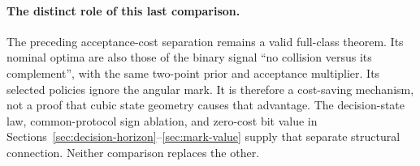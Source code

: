 \documentclass[11pt,a4paper]{article}
\theoremstyle{definition}
\theoremstyle{remark}\newtheorem{remark}[theorem]{Remark}
\begin{document}
\paragraph{The distinct role of this last comparison.}
The preceding acceptance-cost separation remains a valid full-class theorem.
Its nominal optima are also those of the binary signal ``no collision versus
its complement'', with the same two-point prior and acceptance multiplier.
Its selected policies ignore the angular mark. It is therefore a cost-saving
mechanism, not a proof that cubic state geometry causes that advantage.
The decision-state law, common-protocol sign ablation, and zero-cost bit
value in Sections~\ref{sec:decision-horizon}--\ref{sec:mark-value} supply
that separate structural connection. Neither comparison replaces the other.
\appendix



\end{document}
